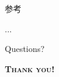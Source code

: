 \begin{frame}[allowframebreaks]{参考}
    \nocite{rasmussen2006gaussian}
    \nocite{Rasmussen2017}
    \nocite{zhangjiangfan2017}
    \nocite{Durrande2017}

    
    \vspace{-0.5ex}
    ...
\end{frame}


\begin{frame}[standout]
    Questions?
\end{frame}

\begin{frame}{}
    \begin{center}
        \textbf{\textsc{\erhao Thank you!}}
    \end{center}
\end{frame}